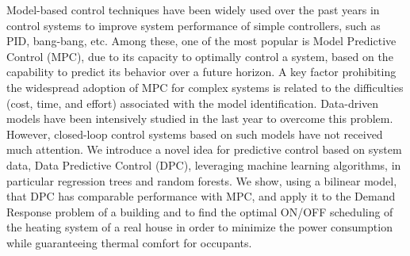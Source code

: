 Model-based control techniques have been widely used over the past years in control systems to improve system performance of simple controllers, such as PID, bang-bang, etc. Among these, one of the most popular is Model Predictive Control (MPC), due to its capacity to optimally control a system, based on the capability to predict its behavior over a future horizon. A key factor prohibiting the widespread adoption of MPC for complex systems is related to the difficulties (cost, time, and effort) associated with the model identification. Data-driven models have been intensively studied in the last year to overcome this problem. However, closed-loop control systems based on such models have not received much attention. We introduce a novel idea for predictive control based on system data, Data Predictive Control (DPC), leveraging machine learning algorithms, in particular regression trees and random forests. We show, using a bilinear model, that DPC has comparable performance with MPC, and apply it to the Demand Response problem of a building and to find the optimal ON/OFF scheduling of the heating system of a real house in order to minimize the power consumption while guaranteeing thermal comfort for occupants.